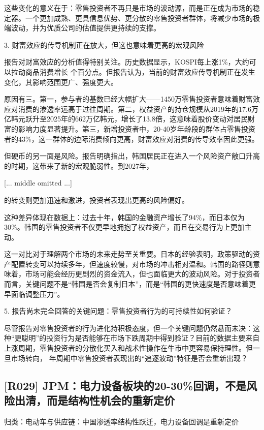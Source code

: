 \documentclass[11pt]{ctexart}
\begin{document}
这些变化的意义在于：零售投资者不再只是市场的波动源，而是正在成为市场的稳定器。一个更加成熟、更具信息优势、更分散的零售投资者群体，将减少市场的极端波动，并为优质公司的估值提供更持续的支撑。

3. 财富效应的传导机制正在放大，但这也意味着更高的宏观风险

报告对财富效应的分析值得特别关注。历史数据显示，KOSPI每上涨1\%，大约可以拉动商品消费增长 个百分点。但报告认为，当前的财富效应传导机制正在发生变化，其影响范围更广、强度更大。

原因有三。第一，参与者的基数已经大幅扩大——1450万零售投资者意味着财富效应对消费的渗透率远高于过往周期。第二，权益资产的持仓规模从2019年的17.6万亿韩元跃升至2025年的662万亿韩元，增长了13.8倍，这意味着股价变动对居民财富的影响力度显著提升。第三，新增投资者中，20-40岁年龄段的群体占零售投资者的43\%，这一群体的边际消费倾向更高，财富效应对消费的传导效率因此更强。

但硬币的另一面是风险。报告明确指出，韩国居民正在进入一个风险资产敞口升高的时期，这带来了新的宏观脆弱性。到2027年，

[... middle omitted ...]

的转变则更加迅速和激进，投资者表现出更高的风险偏好。

这种差异体现在数据上：过去十年，韩国的金融资产增长了94\%，而日本仅为30\%。韩国的零售投资者不仅更早地拥抱了权益资产，而且在交易行为上更加主动。

这一对比对于理解两个市场的未来走势至关重要。日本的经验表明，政策驱动的资产配置转变可以持续多年，但速度较慢，对市场的冲击相对温和。韩国的路径则意味着，市场可能会经历更剧烈的资金流入，但也面临更大的波动风险。对于投资者而言，关键问题不是“韩国是否会复制日本”，而是“韩国的更快速度是否意味着更早面临调整压力”。

5. 报告尚未完全回答的关键问题：零售投资者行为的可持续性如何验证？

尽管报告对零售投资者的行为进化持积极态度，但一个关键问题仍然悬而未决：这种“更聪明”的投资行为是否能够在市场下跌周期中得到验证？目前的数据主要来自上涨周期，零售投资者的分散化买入和战术性操作在牛市中更容易保持理性。但一旦市场转向， 年周期中零售投资者表现出的“追逐波动”特征是否会重新出现？

\subsection{[R029] JPM：电力设备板块的20-30\%回调，不是风险出清，而是结构性机会的重新定价}
{\small\color{refgray}归类：电动车与供应链：中国渗透率结构性跃迁，电力设备回调是重新定价}
\end{document}
